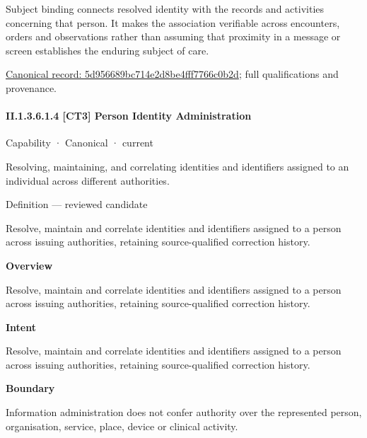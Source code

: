 Subject binding connects resolved identity with the records and activities concerning that person. It makes the association verifiable across encounters, orders and observations rather than assuming that proximity in a message or screen establishes the enduring subject of care.


{\footnotesize \href{../../../../continuum/strategy/capability/feature/5d956689bc714e2d8be4fff7766c0b2d.md}{Canonical record: 5d956689bc714e2d8be4fff7766c0b2d}; full qualifications and provenance.}\par
\paragraph*{II.1.3.6.1.4 [CT3] Person Identity Administration}
\label{navigation:II.1.3.6.1.4}

\label{element:6c3de7750ef1436cad6a9533731782b6}
{\small Capability · Canonical · current}\par

Resolving, maintaining, and correlating identities and identifiers assigned to an individual across different authorities.



Definition — reviewed candidate



Resolve, maintain and correlate identities and identifiers assigned to a person across issuing authorities, retaining source-qualified correction history.



\textbf{Overview}



Resolve, maintain and correlate identities and identifiers assigned to a person across issuing authorities, retaining source-qualified correction history.



\textbf{Intent}



Resolve, maintain and correlate identities and identifiers assigned to a person across issuing authorities, retaining source-qualified correction history.



\textbf{Boundary}



Information administration does not confer authority over the represented person, organisation, service, place, device or clinical activity.




